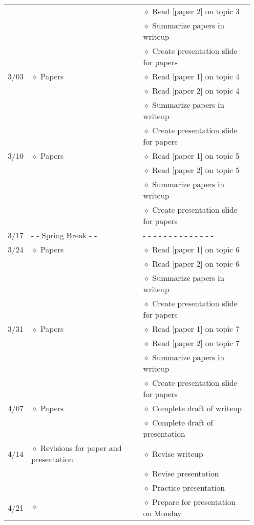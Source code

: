 \documentclass[12pt]{article}
\begin{document}
\begin{table}[ht]
\begin{tabular}{m{0.35in} m{1.5in} m{4.0in}}
        & & $\diamond$ Read [paper 2] on topic 3\\
        & & $\diamond$ Summarize papers in writeup\\
        & & $\diamond$ Create presentation slide for papers\\
    \hline
    3/03 & $\diamond$ Papers & $\diamond$ Read [paper 1] on topic 4\\
        & & $\diamond$ Read [paper 2] on topic 4\\
        & & $\diamond$ Summarize papers in writeup\\
        & & $\diamond$ Create presentation slide for papers\\
    \hline
    3/10 & $\diamond$ Papers & $\diamond$ Read [paper 1] on topic 5\\
        & & $\diamond$ Read [paper 2] on topic 5\\
        & & $\diamond$ Summarize papers in writeup\\
        & & $\diamond$ Create presentation slide for papers\\
    \hline
    3/17 & - - Spring Break - - & - - - - - - - - - - - - - -\\
    \hline
    3/24 & $\diamond$ Papers & $\diamond$ Read [paper 1] on topic 6\\
        & & $\diamond$ Read [paper 2] on topic 6\\
        & & $\diamond$ Summarize papers in writeup\\
        & & $\diamond$ Create presentation slide for papers\\
    \hline
    3/31 & $\diamond$ Papers & $\diamond$ Read [paper 1] on topic 7\\
        & & $\diamond$ Read [paper 2] on topic 7\\
        & & $\diamond$ Summarize papers in writeup\\
        & & $\diamond$ Create presentation slide for papers\\
    \hline
    4/07 & $\diamond$ Papers & $\diamond$ Complete draft of writeup\\
        & & $\diamond$ Complete draft of presentation\\
    \hline
    4/14 & $\diamond$ Revisions for paper and presentation
        & $\diamond$ Revise writeup\\
        & & $\diamond$ Revise presentation\\
        & & $\diamond$ Practice presentation\\
    \hline
    4/21 & $\diamond$ & $\diamond$ Prepare for presentation
    on Monday\\
    \hline
    \end{tabular}
    \label{schedule}
\end{table}
\end{document}
